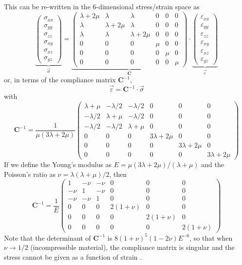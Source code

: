 This can be re-written in the 6-dimensional stress/strain space as
\[
\underbrace{
\left(
\begin{array}{c}
\sigma_{xx} \\
\sigma_{yy} \\
\sigma_{zz} \\
\sigma_{xy} \\
\sigma_{xz} \\
\sigma_{yz} 
\end{array}
\right)}
_{\vec{\sigma}}
=
\underbrace{
\left(
\begin{array}{cccccc}
\lambda+2\mu & \lambda & \lambda & 0 & 0 & 0 \\ 
\lambda & \lambda+2\mu & \lambda & 0 & 0 & 0 \\ 
\lambda & \lambda & \lambda+2\mu & 0 & 0 & 0 \\
0 & 0 & 0 & \mu & 0 & 0 \\ 
0 & 0 & 0 & 0 & \mu & 0 \\ 
0 & 0 & 0 & 0 & 0 & \mu  
\end{array}
\right)}
_{{\bm C}}
\cdot
\underbrace{
\left(
\begin{array}{c}
\varepsilon_{xx} \\
\varepsilon_{yy} \\
\varepsilon_{zz} \\
\varepsilon_{xy} \\
\varepsilon_{xz} \\
\varepsilon_{yz} 
\end{array}
\right)}
_{\vec{\varepsilon}}
\]
or, in terms of the compliance matrix ${\bm C}^{-1}$,
\[
\vec{\varepsilon} 
= {\bm C}^{-1} \cdot \vec{\sigma}
\]
with
\[
{\bm C}^{-1}
=
\frac{1}{\mu(3\lambda+2\mu)}
\left(
\begin{array}{cccccc}
\lambda+\mu & -\lambda/2 & -\lambda/2 & 0 & 0 & 0 \\
-\lambda/2 & \lambda+\mu & -\lambda/2 & 0 & 0 & 0 \\
-\lambda/2 & -\lambda/2 & \lambda+\mu & 0 & 0 & 0 \\
0 & 0 & 0 & 3\lambda+2\mu & 0 & 0 \\ 
0 & 0 & 0 & 0 & 3\lambda+2\mu & 0 \\ 
0 & 0 & 0 & 0 & 0 & 3\lambda+2\mu  
\end{array}
\right)
\]
If we define the Young's modulus as $E=\mu(3\lambda+2\mu)/(\lambda+\mu)$ 
and the Poisson's ratio as $\nu=\lambda(\lambda+\mu)/2$, then
\[
{\bm C}^{-1}
=
\frac{1}{E}
\left(
\begin{array}{cccccc}
1 & -\nu & -\nu & 0 & 0 & 0 \\
-\nu & 1 & -\nu & 0 & 0 & 0 \\
-\nu & -\nu & 1 & 0 & 0 & 0 \\
0 & 0 & 0 & 2(1+\nu) & 0 & 0 \\ 
0 & 0 & 0 & 0 & 2(1+\nu) & 0 \\ 
0 & 0 & 0 & 0 & 0 & 2(1+\nu) 
\end{array}
\right)
\]
Note that the determinant  of ${\bm C}^{-1}$ is $8(1+\nu)^5(1-2\nu)E^{-6}$,
so that when $\nu\rightarrow 1/2$ (incompressible material), the compliance
matrix is singular and the stress cannot be given as a function of strain \cite{lubliner}.


